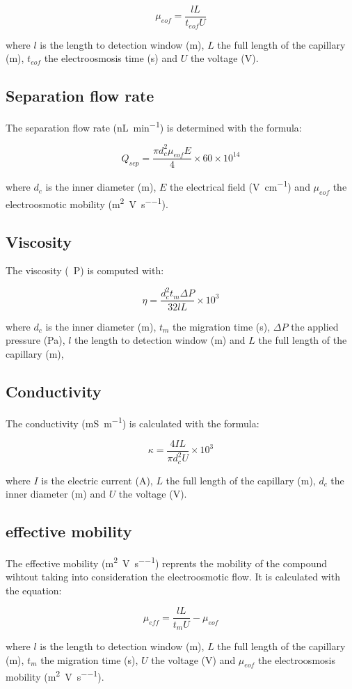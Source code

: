\documentclass{article}
\begin{document}
\[ \mu_{eof} = \frac{lL}{t_{eof}U} \]

where \(l\) is the length to detection window (\si{\meter}), \(L\) the full length of the capillary (\si{\meter}), \(t_{eof}\) the electroosmosis time (\si{\second}) and \(U\) the voltage (\si{\volt}).


\subsection{Separation flow rate}

The separation flow rate (\si{\nano\liter\per\minute}) is determined with the formula:

\[ Q_{sep} = \frac{{\pi}d_c^2\mu_{eof}E}{4} \times 60 \times 10^{14} \]

where \(d_c\) is the inner diameter (\si{\meter}), \(E\) the electrical field (\si{\volt\per\centi\meter}) and \(\mu_{eof}\) the electroosmotic mobility (\si{\meter\squared\per\volt\per\second}).


\subsection{Viscosity}

The viscosity (\si{{\centi}P}) is computed with:

\[ \eta = \frac{d_c^2t_m{\Delta}P}{32lL} \times 10^3 \]

where \(d_c\) is the inner diameter (\si{\meter}), \(t_m\) the migration time (\si{\second}), \({\Delta}P\) the applied pressure (\si{\pascal}), \(l\) the length to detection window (\si{\meter}) and \(L\) the full length of the capillary (\si{\meter}), 


\subsection{Conductivity}

The conductivity (\si{\milli\siemens\per\meter}) is calculated with the formula\citep{conductivity}:

\[ \kappa = \frac{4IL}{{\pi}d_c^2U} \times 10^3 \]

where  \(I\) is the electric current (\si{\ampere}), \(L\) the full length of the capillary (\si{\meter}), \(d_c\) the inner diameter (\si{\meter}) and \(U\) the voltage (\si{\volt}).


\subsection{effective mobility}

The effective mobility (\si{\meter\squared\per\volt\per\second}) reprents the mobility of the compound wihtout taking into consideration the electroosmotic flow. It is calculated with the equation:

\[ \mu_{eff} = \frac{lL}{t_mU} - \mu_{eof} \]

where \(l\) is the length to detection window (\si{\meter}), \(L\) the full length of the capillary (\si{\meter}), \(t_m\) the migration time (\si{\second}), \(U\) the voltage (\si{\volt}) and \(\mu_{eof}\) the electroosmosis mobility (\si{\meter\squared\per\volt\per\second}).



\end{document}
